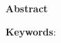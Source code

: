 \begin{center}
\textbf{\large{Abstract}	}
\end{center}

\begin{small}



\vspace*{1cm}
\textbf{Keywords}: 
\end{small}